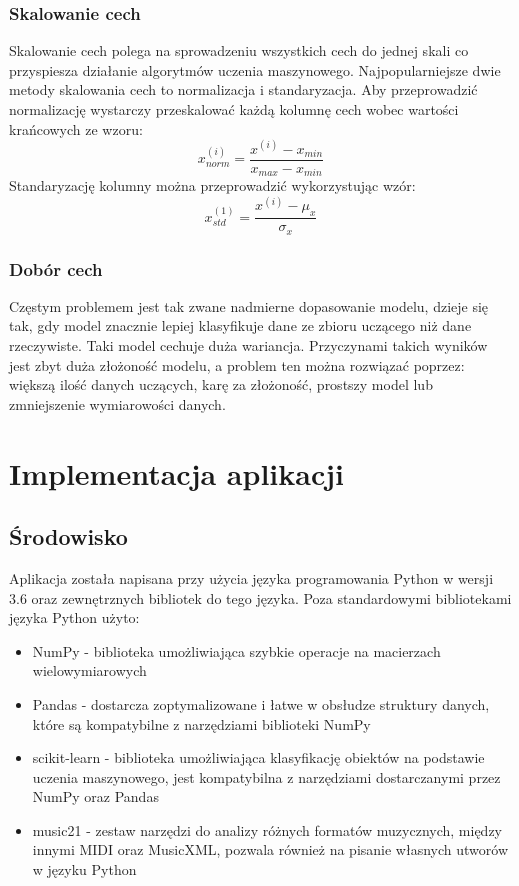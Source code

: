\documentclass[printmode, eng, openany]{mgr}
\newcommand\tab[1][1cm]{\hspace*{#1}}
\begin{document}
\subsection{Skalowanie cech}
\tab Skalowanie cech polega na sprowadzeniu wszystkich cech do jednej skali co przyspiesza działanie algorytmów uczenia maszynowego. Najpopularniejsze dwie metody skalowania cech to normalizacja i standaryzacja. Aby przeprowadzić normalizację wystarczy przeskalować każdą kolumnę cech wobec wartości krańcowych ze wzoru:\\
\begin{equation}
x^{(i)}_{norm} = \dfrac{x^{(i)}-x_{min}}{x_{max}-x_{min}}
\end{equation}
Standaryzację kolumny można przeprowadzić wykorzystując wzór:\\
\begin{equation}
x^{(1)}_{std} = \dfrac{x^{(i)} - \mu_x}{\sigma_x}
\end{equation}
\subsection{Dobór cech}
\tab Częstym problemem jest tak zwane nadmierne dopasowanie modelu, dzieje się tak, gdy model znacznie lepiej klasyfikuje dane ze zbioru uczącego niż dane rzeczywiste. Taki model cechuje duża wariancja. Przyczynami takich wyników jest zbyt duża złożoność modelu, a problem ten można rozwiązać poprzez: większą ilość danych uczących, karę za złożoność, prostszy model lub zmniejszenie wymiarowości danych.
\chapter{Implementacja aplikacji}
\section{Środowisko}
\tab Aplikacja została napisana przy użycia języka programowania Python w wersji 3.6 oraz zewnętrznych bibliotek do tego języka. Poza standardowymi bibliotekami języka Python użyto:
\begin{itemize}
\item NumPy - biblioteka umożliwiająca szybkie operacje na macierzach wielowymiarowych
\item Pandas - dostarcza zoptymalizowane i łatwe w obsłudze struktury danych, które są kompatybilne z narzędziami biblioteki NumPy
\item scikit-learn - biblioteka umożliwiająca klasyfikację obiektów na podstawie uczenia maszynowego, jest kompatybilna z narzędziami dostarczanymi przez NumPy oraz Pandas
\item music21 - zestaw narzędzi do analizy różnych formatów muzycznych, między innymi MIDI oraz MusicXML, pozwala również na pisanie własnych utworów w języku Python
\end{itemize}
\end{document}
